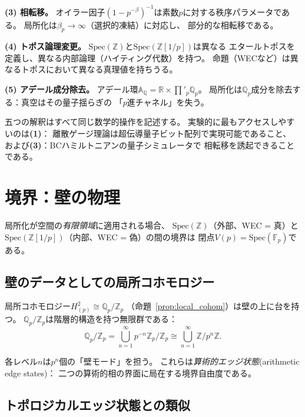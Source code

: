 \documentclass[11pt,a4paper]{article}
\newcommand{\Spec}{\mathrm{Spec}}
\newcommand{\Zp}{\mathbb{Z}[1/p]}
\newcommand{\Qp}{\mathbb{Q}_p}
\newcommand{\Fp}{\mathbb{F}_p}
\begin{document}
\textbf{(3) 相転移。}
オイラー因子$(1-p^{-\beta})^{-1}$は素数$p$に対する秩序パラメータである。
局所化は$\beta_p \to \infty$（選択的凍結）に対応し、
部分的な相転移である。

\textbf{(4) トポス論理変更。}
$\Spec(\mathbb{Z})$と$\Spec(\Zp)$は異なる
エタールトポスを定義し、異なる内部論理（ハイティング代数）を持つ。
命題（WECなど）は異なるトポスにおいて異なる真理値を持ちうる。

\textbf{(5) アデール成分除去。}
アデール環$\mathbb{A}_\mathbb{Q} = \mathbb{R} \times \prod'_p \Qp$。
局所化は$\Qp$成分を除去する：真空はその量子揺らぎの
「$p$進チャネル」を失う。

五つの解釈はすべて同じ数学的操作を記述する。
実験的に最もアクセスしやすいのは\textbf{(1)}：
離散ゲージ理論は超伝導量子ビット配列で実現可能であること、
および\textbf{(3)}：BCハミルトニアンの量子シミュレータで
相転移を誘起できることである。

\section{境界：壁の物理}
\label{sec:boundary}

局所化が空間の\emph{有限領域}に適用される場合、
$\Spec(\mathbb{Z})$（外部、WEC = 真）と
$\Spec(\Zp)$（内部、WEC = 偽）の間の境界は
閉点$V(p) = \Spec(\Fp)$である。

\subsection{壁のデータとしての局所コホモロジー}

局所コホモロジー$H^2_{(p)} \cong \Qp/\mathbb{Z}_p$
（命題~\ref{prop:local_cohom}）は壁の上に台を持つ。
$\Qp/\mathbb{Z}_p$は階層的構造を持つ無限群である：
\begin{equation}
  \Qp/\mathbb{Z}_p = \bigcup_{n=1}^{\infty} p^{-n}\mathbb{Z}_p / \mathbb{Z}_p
  \cong \bigcup_{n=1}^{\infty} \mathbb{Z}/p^n\mathbb{Z}.
\end{equation}

各レベル$n$は$p^n$個の「壁モード」を担う。
これらは\emph{算術的エッジ状態}(arithmetic edge states)：
二つの算術的相の界面に局在する境界自由度である。

\subsection{トポロジカルエッジ状態との類似}
\end{document}

